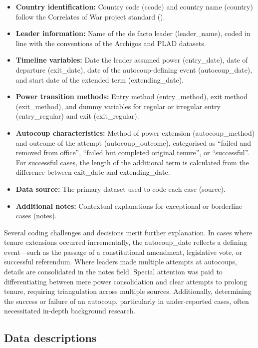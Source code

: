 \documentclass[
  12pt,
]{report}
\begin{document}
\begin{itemize}
\item
  \textbf{Country identification:} Country code (ccode) and country name
  (country) follow the Correlates of War project standard
  ().
\item
  \textbf{Leader information:} Name of the de facto leader
  (leader\_name), coded in line with the conventions of the Archigos and
  PLAD datasets.
\item
  \textbf{Timeline variables:} Date the leader assumed power
  (entry\_date), date of departure (exit\_date), date of the
  autocoup-defining event (autocoup\_date), and start date of the
  extended term (extending\_date).
\item
  \textbf{Power transition methods:} Entry method (entry\_method), exit
  method (exit\_method), and dummy variables for regular or irregular
  entry (entry\_regular) and exit (exit\_regular).
\item
  \textbf{Autocoup characteristics:} Method of power extension
  (autocoup\_method) and outcome of the attempt (autocoup\_outcome),
  categorised as ``failed and removed from office'', ``failed but
  completed original tenure'', or ``successful''. For successful cases,
  the length of the additional term is calculated from the difference
  between exit\_date and extending\_date.
\item
  \textbf{Data source:} The primary dataset used to code each case
  (source).
\item
  \textbf{Additional notes:} Contextual explanations for exceptional or
  borderline cases (notes).
\end{itemize}

Several coding challenges and decisions merit further explanation. In
cases where tenure extensions occurred incrementally, the autocoup\_date
reflects a defining event---such as the passage of a constitutional
amendment, legislative vote, or successful referendum. Where leaders
made multiple attempts at autocoups, details are consolidated in the
notes field. Special attention was paid to differentiating between mere
power consolidation and clear attempts to prolong tenure, requiring
triangulation across multiple sources. Additionally, determining the
success or failure of an autocoup, particularly in under-reported cases,
often necessitated in-depth background research.

\subsection*{Data descriptions}\label{data-descriptions}
\end{document}
